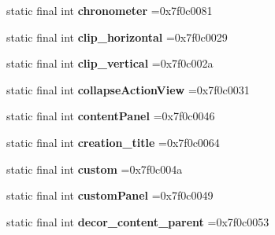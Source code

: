\begin{DoxyCompactItemize}
\item 
\hypertarget{classcheck_1_1test_1_1_r_1_1id_abdca1b3b8b09cd9202f418a9560cd94d}{}static final int {\bfseries chronometer} =0x7f0c0081\label{classcheck_1_1test_1_1_r_1_1id_abdca1b3b8b09cd9202f418a9560cd94d}

\item 
\hypertarget{classcheck_1_1test_1_1_r_1_1id_a30b18e9e70cd31288ca03e8919d1edc9}{}static final int {\bfseries clip\+\_\+horizontal} =0x7f0c0029\label{classcheck_1_1test_1_1_r_1_1id_a30b18e9e70cd31288ca03e8919d1edc9}

\item 
\hypertarget{classcheck_1_1test_1_1_r_1_1id_a8af2bfb1a80dac3a08abe583784425bf}{}static final int {\bfseries clip\+\_\+vertical} =0x7f0c002a\label{classcheck_1_1test_1_1_r_1_1id_a8af2bfb1a80dac3a08abe583784425bf}

\item 
\hypertarget{classcheck_1_1test_1_1_r_1_1id_a5f72b85418ccb3fdc71fc6abfaf26652}{}static final int {\bfseries collapse\+Action\+View} =0x7f0c0031\label{classcheck_1_1test_1_1_r_1_1id_a5f72b85418ccb3fdc71fc6abfaf26652}

\item 
\hypertarget{classcheck_1_1test_1_1_r_1_1id_af23e07aa4182f0fc64b8c1add63b5266}{}static final int {\bfseries content\+Panel} =0x7f0c0046\label{classcheck_1_1test_1_1_r_1_1id_af23e07aa4182f0fc64b8c1add63b5266}

\item 
\hypertarget{classcheck_1_1test_1_1_r_1_1id_ae67e1e243cea10cf9f34177a1397144d}{}static final int {\bfseries creation\+\_\+title} =0x7f0c0064\label{classcheck_1_1test_1_1_r_1_1id_ae67e1e243cea10cf9f34177a1397144d}

\item 
\hypertarget{classcheck_1_1test_1_1_r_1_1id_a3c01b17cf4e8c4320b0b572717fb115d}{}static final int {\bfseries custom} =0x7f0c004a\label{classcheck_1_1test_1_1_r_1_1id_a3c01b17cf4e8c4320b0b572717fb115d}

\item 
\hypertarget{classcheck_1_1test_1_1_r_1_1id_a47ea0f7ca58149a9735c3c82b58e24d1}{}static final int {\bfseries custom\+Panel} =0x7f0c0049\label{classcheck_1_1test_1_1_r_1_1id_a47ea0f7ca58149a9735c3c82b58e24d1}

\item 
\hypertarget{classcheck_1_1test_1_1_r_1_1id_a86efd97d588fc2a1950ea33ed3be66af}{}static final int {\bfseries decor\+\_\+content\+\_\+parent} =0x7f0c0053\label{classcheck_1_1test_1_1_r_1_1id_a86efd97d588fc2a1950ea33ed3be66af}


\end{DoxyCompactItemize}
